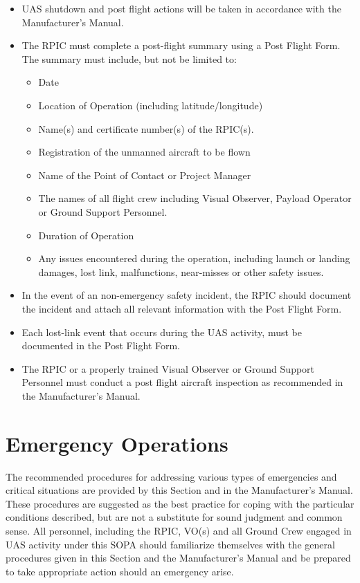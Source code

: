 \documentclass[
]{book}
\providecommand{\tightlist}{%
  \setlength{\itemsep}{0pt}\setlength{\parskip}{0pt}}
\begin{document}
\begin{itemize}
\item
  UAS shutdown and post flight actions will be taken in accordance with the Manufacturer's Manual.
\item
  The RPIC must complete a post-flight summary using a Post Flight Form. The summary must include, but not be limited to:

  \begin{itemize}
  \tightlist
  \item
    Date
  \item
    Location of Operation (including latitude/longitude)
  \item
    Name(s) and certificate number(s) of the RPIC(s).
  \item
    Registration of the unmanned aircraft to be flown
  \item
    Name of the Point of Contact or Project Manager
  \item
    The names of all flight crew including Visual Observer, Payload Operator or Ground Support Personnel.
  \item
    Duration of Operation
  \item
    Any issues encountered during the operation, including launch or landing damages, lost link, malfunctions, near-misses or other safety issues.
  \end{itemize}
\item
  In the event of an non-emergency safety incident, the RPIC should document the incident and attach all relevant information with the Post Flight Form.\\
\item
  Each lost-link event that occurs during the UAS activity, must be documented in the Post Flight Form.
\item
  The RPIC or a properly trained Visual Observer or Ground Support Personnel must conduct a post flight aircraft inspection as recommended in the Manufacturer's Manual.
\end{itemize}

\hypertarget{emergency-operations}{%
\chapter{Emergency Operations}\label{emergency-operations}}

The recommended procedures for addressing various types of emergencies and critical situations are provided by this Section and in the Manufacturer's Manual. These procedures are suggested as the best practice for coping with the particular conditions described, but are not a substitute for sound judgment and common sense. All personnel, including the RPIC, VO(s) and all Ground Crew engaged in UAS activity under this SOPA should familiarize themselves with the general procedures given in this Section and the Manufacturer's Manual and be prepared to take appropriate action should an emergency arise.
\end{document}
